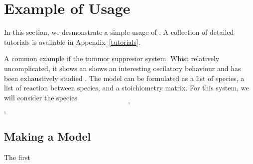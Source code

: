 \section{Example of Usage} \label{examples}
In this section, we desmonstrate a simple usage of \means. 
A collection of detailed tutorials is available in Appendix~\ref{tutorials}.

A common example if the tummor suppresior \pft system. 
Whist relatively uncomplicated, it shows an shows an interesting oscilatory behaviour and has been exhaustively studied \cite{geva-zatorsky_oscillations_2006, batchelor_ups_2009}.
The model can be formulated as a list of species, a list of reaction between species, and a stoichiometry matrix.
For this system, we will consider the species $$, $$, $$

\subsection{Making a Model}
The first






